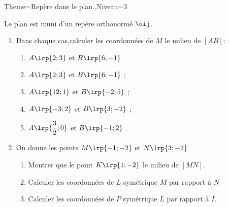 \documentclass[a4paper,12pt]{article}
\begin{document}
\begin{Maquette}[Fiche]{Theme=Repère dans le plan.,Niveau=3}
\begin{exercice}
Le plan est muni d'un repère orthonormé $ \oij$.
\begin{enumerate} 
\item Dans chaque cas,calculer les coordonnées de $M$ le milieu de $[AB]$:
\begin{multicols*}{2} 
\begin{enumerate} 
\item $A\lrp{2;3}$ et $B\lrp{6,-1}$
\item $A\lrp{2 ; 3}$ et $B\lrp{6 ; -1}$ ; 
\item $A\lrp{12 ; 1}$ et $B\lrp{-2 ; 5} $ ; 
\item $A\lrp{-3 ; 2} $ et $B \lrp{3 ; -2} $ ; 
\item $A\lrp{\dfrac{3}{2} ; 0}$ et $B\lrp{-1 ; 2} $ . 
\end{enumerate}
\end{multicols*} 
\item On donne les points $ M\lrp{-1;-2} $  et  $ N \lrp{3;-2} $ 
 \begin{enumerate} 
\item Montrer que le point $ K \lrp{1 ; -2 } $ le milieu de $ \left[ MN \right] $.
\item Calculer les coordonnées de $L$ symétrique $M$ par rapport à $N$ 
\item Calculer les coordonnées de $P$ symétrique $L$ par rapport à $I$. 
\end{enumerate}
\end{enumerate}
\end{exercice}




\end{Maquette}
\end{document}
